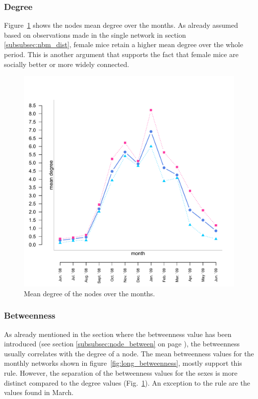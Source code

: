 \subsubsection{Degree}

Figure~\ref{fig:long_degree} shows the nodes mean degree over the months. As already assumed based on observations made in the single network in section \ref{subsubsec:nbm_dist}, female mice retain a higher mean degree over the whole period. This is another argument that supports the fact that female mice are socially better or more widely connected.


\begin{figure}[htpb]
\begin{center}
  \includegraphics[width=.6\textwidth]{assets/pdf/long_degree.pdf}
  \caption[Mean degree of the nodes over the months]{Mean degree of the nodes over the months.}
  \label{fig:long_degree}
\end{center}
\end{figure} 


\subsubsection{Betweenness}
\label{subsubsec:long_betweenness}

As already mentioned in the section where the betweenness value has been introduced (see section \ref{subsubsec:node_between} on page \pageref{subsubsec:node_between}), the betweenness usually correlates with the degree of a node. The mean betweenness values for the monthly networks shown in figure~\ref{fig:long_betweenness}, mostly support this rule. However, the separation of the betweenness values for the sexes is more distinct compared to the degree values (Fig.~\ref{fig:long_degree}). An exception to the rule are the values found in March.   

